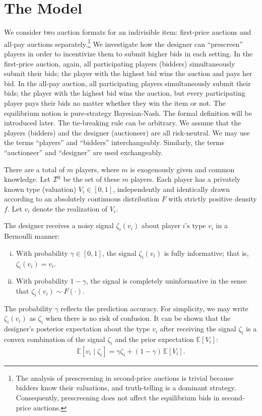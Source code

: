 \section{The Model}\label{sec:model}




We consider two auction formats for an indivisible item: first-price auctions and all-pay auctions separately.\footnote{The analysis of prescreening in second-price auctions is trivial because bidders know their valuations, and truth-telling is a dominant strategy. Consequently, prescreening does not affect the equilibrium bids in second-price auctions.
}
We investigate how the designer can “prescreen” players in order to incentivize them to submit higher bids in each setting. In the first-price auction, again, all participating players (bidders) simultaneously submit their bids; the player with the highest bid wins the auction and pays her bid. In the all-pay auction, all participating players simultaneously submit their bids; the player with the highest bid wins the auction, but every participating player pays their bids no matter whether they win the item or not.
The equilibrium notion is pure-strategy Bayesian-Nash. 
The formal definition will be introduced later.
The tie-breaking rule can be arbitrary.
We assume that the players (bidders) and the designer (auctioneer) are all risk-neutral.
We may use the terms ``players'' and ``bidders'' interchangeably. Similarly, the terms ``auctioneer'' and ``designer'' are used exchangeably.

There are a total of $m$ players, where $m$ is exogenously given and common knowledge. Let $\mathcal{I}^0$ be the set of these $m$ players. Each player has a privately known type (valuation) $V_i\in[0,1]$, independently and identically drawn according to an absolutely continuous distribution $F$ with strictly positive density $f$.
Let $v_i$ denote the realization of $V_i$.

The designer receives a noisy signal $\zeta_i(v_i)$ about player $i$'s type $v_i$ in a Bernoulli manner:
\begin{enumerate}[(i)]
    \item With probability $\gamma\in[0,1]$, the signal $\zeta_i(v_i)$ is fully informative; that is, $\zeta_i(v_i)=v_i$.
    \item With probability $1-\gamma$, the signal is completely uninformative in the sense that $\zeta_i(v_i)\sim F(\cdot)$.
\end{enumerate}
The probability $\gamma$ reflects the prediction accuracy. 
For simplicity, we may write $\zeta_i(v_i)$ as $\zeta_i$ when there is no risk of confusion. It can be shown that the designer's posterior expectation about the type $v_i$ after receiving the signal $\zeta_i$ is a convex combination of the signal $\zeta_i$ and the prior expectation $\mathbb{E}[V_i]$:
\begin{align}
\label{eq:posterior_expectation_designer}
    \mathbb{E}[v_i\mid \zeta_i] = \gamma \zeta_i + (1-\gamma)\, \mathbb{E}[V_i].
\end{align}



